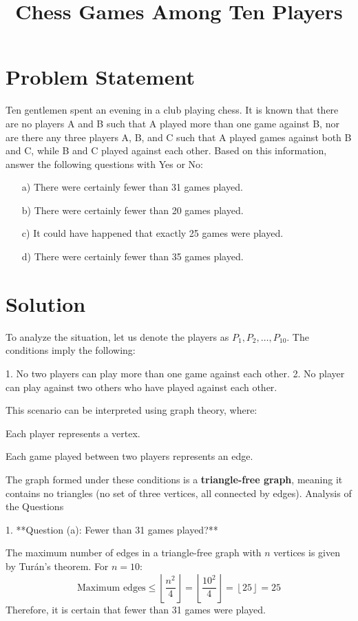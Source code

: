 \documentclass{article}
\begin{document}
\title{Chess Games Among Ten Players}
\author{}
\date{}
\maketitle

\section*{Problem Statement}
Ten gentlemen spent an evening in a club playing chess. It is known that there are no players A and B such that A played more than one game against B, nor are there any three players A, B, and C such that A played games against both B and C, while B and C played against each other. Based on this information, answer the following questions with Yes or No:
\begin{enumerate}
    \item[a)] There were certainly fewer than 31 games played.
    \item[b)] There were certainly fewer than 20 games played.
    \item[c)] It could have happened that exactly 25 games were played.
    \item[d)] There were certainly fewer than 35 games played.
\end{enumerate}

\section*{Solution}

To analyze the situation, let us denote the players as \( P_1, P_2, \ldots, P_{10} \). The conditions imply the following:

1. No two players can play more than one game against each other.
2. No player can play against two others who have played against each other.

This scenario can be interpreted using graph theory, where:


    Each player represents a vertex.

    Each game played between two players represents an edge.

The graph formed under these conditions is a \textbf{triangle-free graph}, meaning it contains no triangles (no set of three vertices, all connected by edges).
Analysis of the Questions

1. **Question (a): Fewer than 31 games played?**

The maximum number of edges in a triangle-free graph with \( n \) vertices is given by Turán’s theorem. For \( n = 10 \):
   \[
   \text{Maximum edges} \leq \left\lfloor \frac{n^2}{4} \right\rfloor = \left\lfloor \frac{10^2}{4} \right\rfloor = \left\lfloor 25 \right\rfloor = 25
   \]
   Therefore, it is certain that fewer than 31 games were played.
\end{document}
